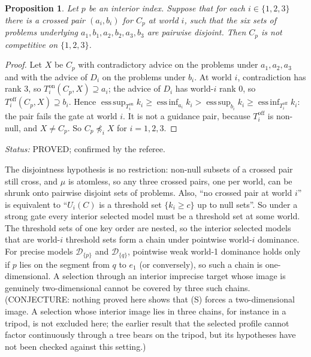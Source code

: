 \documentclass[11pt]{article}
\newtheorem{proposition}[theorem]{Proposition}
\theoremstyle{definition}\newtheorem{definition}[theorem]{Definition}
\theoremstyle{remark}\newtheorem{remark}[theorem]{Remark}
\newcommand{\Dscr}{\mathcal D}
\newcommand{\on}{\mathrm{on}}
\newcommand{\off}{\mathrm{off}}
\newcommand{\esssup}{\operatorname*{ess\,sup}}
\newcommand{\essinf}{\operatorname*{ess\,inf}}
\newcommand{\status}[1]{\par\noindent\emph{Status:} #1\par}
\begin{document}
\begin{proposition}\label{prop:three}
Let $p$ be an interior index. Suppose that for each $i\in\{1,2,3\}$ there is a
crossed pair $(a_i,b_i)$ for $C_p$ at world $i$, such that the six sets of
problems underlying $a_1,b_1,a_2,b_2,a_3,b_3$ are pairwise disjoint. Then $C_p$
is not competitive on $\{1,2,3\}$.
\end{proposition}
\begin{proof}
Let $X$ be $C_p$ with contradictory advice on the problems under
$a_1,a_2,a_3$ and with the advice of $D_i$ on the problems under $b_i$. At
world $i$, contradiction has rank $3$, so $T^\on_i(C_p,X)\supseteq a_i$; the
advice of $D_i$ has world-$i$ rank $0$, so $T^\off_i(C_p,X)\supseteq b_i$.
Hence $\esssup_{T^\on_i}k_i\ge\essinf_{a_i}k_i>\esssup_{b_i}k_i\ge
\essinf_{T^\off_i}k_i$: the pair fails the gate at world $i$. It is not a
guidance pair, because $T^\off_i$ is non-null, and $X\ne C_p$. So
$C_p\not\preceq_iX$ for $i=1,2,3$.
\end{proof}

\status{PROVED; confirmed by the referee.}

The disjointness hypothesis is no restriction: non-null subsets of a crossed
pair still cross, and $\mu$ is atomless, so any three crossed pairs, one per
world, can be shrunk onto pairwise disjoint sets of problems. Also, ``no
crossed pair at world $i$'' is equivalent to ``$U_i(C)$ is a threshold set
$\{k_i\ge c\}$ up to null sets''. So under a strong gate every interior selected
model must be a threshold set at some world. The threshold sets of one key
order are nested, so the interior selected models that are world-$i$ threshold
sets form a chain under pointwise world-$i$ dominance. For precise models
$\Dscr_{\{p\}}$ and $\Dscr_{\{q\}}$, pointwise weak world-1 dominance holds
only if $p$ lies on the segment from $q$ to $e_1$ (or conversely), so such a
chain is one-dimensional. A selection through an interior imprecise target
whose image is genuinely two-dimensional cannot be covered by three such
chains. (CONJECTURE: nothing proved here shows that (S) forces a
two-dimensional image. A selection whose interior image lies in three chains,
for instance in a tripod, is not excluded here; the earlier result that the
selected profile cannot factor continuously through a tree bears on the tripod,
but its hypotheses have not been checked against this setting.)
\end{document}

